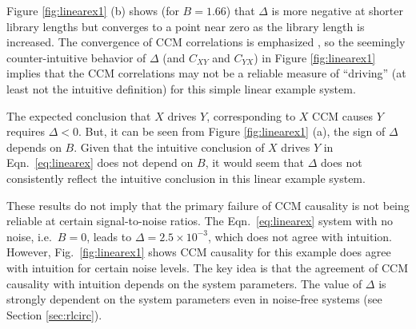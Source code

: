 \documentclass[twocolumn,aps,pre,groupedaddress]{revtex4-1}
\begin{document}
Figure \ref{fig:linearex1} (b) shows (for $B = 1.66$) that $\Delta$ is more negative at shorter library lengths but converges to a point near zero as the library length is increased.  The convergence of CCM correlations is emphasized \cite{Sugihara2012}, so the seemingly counter-intuitive behavior of $\Delta$ (and $C_{XY}$ and $C_{YX}$) in Figure \ref{fig:linearex1} implies that the CCM correlations may not be a reliable measure of ``driving'' (at least not the intuitive definition) for this simple linear example system.

The expected conclusion that $X$ drives $Y$, corresponding to $X$ CCM causes $Y$ requires $\Delta<0$.  But, it can be seen from Figure \ref{fig:linearex1} (a), the sign of $\Delta$ depends on $B$.  Given that the intuitive conclusion of $X$ drives $Y$ in Eqn.\ \ref{eq:linearex} does not depend on $B$, it would seem that $\Delta$ does not consistently reflect the intuitive conclusion in this linear example system. 

These results do not imply that the primary failure of CCM causality is not being reliable at certain signal-to-noise ratios.  The Eqn.\ \ref{eq:linearex} system with no noise, i.e.\ $B=0$, leads to $\Delta=2.5\times 10^{-3}$, which does not agree with intuition.  However, Fig.\ \ref{fig:linearex1} shows CCM causality for this example does agree with intuition for certain noise levels.  The key idea is that the agreement of CCM causality with intuition depends on the system parameters.  The value of $\Delta$ is strongly dependent on the system parameters even in noise-free systems (see Section \ref{sec:rlcirc}). 
\end{document}
